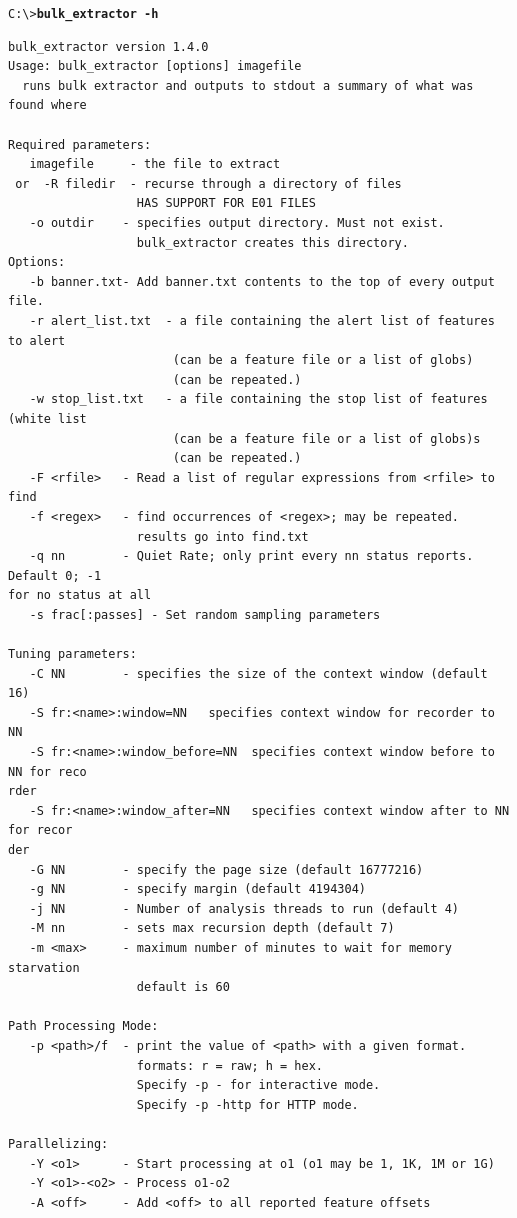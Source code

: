 \documentclass[11pt]{article} %
\begin{document}
\begingroup
\footnotesize
\texttt{C:\textbackslash \textgreater \textbf{bulk\_extractor -h}}
\endgroup
\begingroup
\footnotesize
\begin{Verbatim}[fontfamily=courier]
bulk_extractor version 1.4.0
Usage: bulk_extractor [options] imagefile
  runs bulk extractor and outputs to stdout a summary of what was found where

Required parameters:
   imagefile     - the file to extract
 or  -R filedir  - recurse through a directory of files
                  HAS SUPPORT FOR E01 FILES
   -o outdir    - specifies output directory. Must not exist.
                  bulk_extractor creates this directory.
Options:
   -b banner.txt- Add banner.txt contents to the top of every output file.
   -r alert_list.txt  - a file containing the alert list of features to alert
                       (can be a feature file or a list of globs)
                       (can be repeated.)
   -w stop_list.txt   - a file containing the stop list of features (white list
                       (can be a feature file or a list of globs)s
                       (can be repeated.)
   -F <rfile>   - Read a list of regular expressions from <rfile> to find
   -f <regex>   - find occurrences of <regex>; may be repeated.
                  results go into find.txt
   -q nn        - Quiet Rate; only print every nn status reports. Default 0; -1
for no status at all
   -s frac[:passes] - Set random sampling parameters

Tuning parameters:
   -C NN        - specifies the size of the context window (default 16)
   -S fr:<name>:window=NN   specifies context window for recorder to NN
   -S fr:<name>:window_before=NN  specifies context window before to NN for reco
rder
   -S fr:<name>:window_after=NN   specifies context window after to NN for recor
der
   -G NN        - specify the page size (default 16777216)
   -g NN        - specify margin (default 4194304)
   -j NN        - Number of analysis threads to run (default 4)
   -M nn        - sets max recursion depth (default 7)
   -m <max>     - maximum number of minutes to wait for memory starvation
                  default is 60

Path Processing Mode:
   -p <path>/f  - print the value of <path> with a given format.
                  formats: r = raw; h = hex.
                  Specify -p - for interactive mode.
                  Specify -p -http for HTTP mode.

Parallelizing:
   -Y <o1>      - Start processing at o1 (o1 may be 1, 1K, 1M or 1G)
   -Y <o1>-<o2> - Process o1-o2
   -A <off>     - Add <off> to all reported feature offsets


\end{Verbatim}
\end{document}
